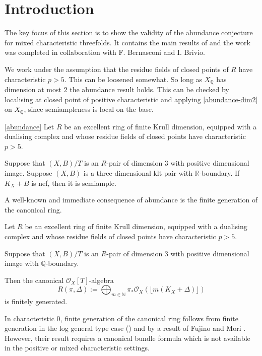 \documentclass[a4paper,12pt]{book}
\newcommand{\ox}{\mathcal{O}_{X}}
\begin{document}
	\section{Introduction}
	
	The key focus of this section is to show the validity of the abundance conjecture for mixed characteristic threefolds. It contains the main results of \cite{bernasconi2021abundance} and the work was completed in collaboration with F. Bernasconi and I. Brivio. 
	
	We work under the assumption that the residue fields of closed points of $R$ have characteristic $p>5$. This can be loosened somewhat. So long as $X_{\mathbb{Q}}$ has dimension at most $2$ the abundance result holds. This can be checked by localising at closed point of positive characteristic and applying \autoref{abundance-dim2} on $X_{\mathbb{Q}}$, since semiampleness is local on the base.
	
	\begin{theorem}\label{Main_Abund1}\autoref{abundance}
		Let $R$ be an excellent ring of finite Krull dimension, equipped with a dualising complex and whose residue fields of closed points have characteristic $p>5$.
		
		Suppose that $(X,B)/T$ is an $R$-pair of dimension $3$ with positive dimensional image.
		Suppose $(X,B)$ is a three-dimensional klt pair with $\mathbb{R}$-boundary. If $K_X+B$ is nef, then it is semiample.
	\end{theorem}

	

	A well-known and immediate consequence of abundance is the finite generation of the canonical ring.
	
	\begin{theorem}
		Let $R$ be an excellent ring of finite Krull dimension, equipped with a dualising complex and whose residue fields of closed points have characteristic $p>5$.
		
		Suppose that $(X,B)/T$ is an $R$-pair of dimension $3$ with positive dimensional image with $\mathbb{Q}$-boundary. 
		
		Then the canonical $\ox[T]$-algebra
		\[R(\pi,\Delta):=\bigoplus_{m \in \mathbb{N}} \pi_{*}\ox(\lfloor m(K_{X}+\Delta)\rfloor)\]
		is finitely generated.
	\end{theorem}

	In characteristic $0$, finite generation of the canonical ring follows from finite generation in the log general type case (\cite{BCHM10}) and by a result of Fujino and Mori \cite[Theorem 5.2]{FM00}. However, their result requires a canonical bundle formula which is not available in the positive or mixed characteristic settings.
\end{document}
